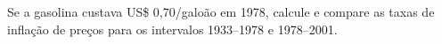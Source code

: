 Se a gasolina custava US\$ 0,70/galo\~ao em 1978, calcule e compare as taxas de inflação de preços para os intervalos 1933--1978 e 1978--2001.
